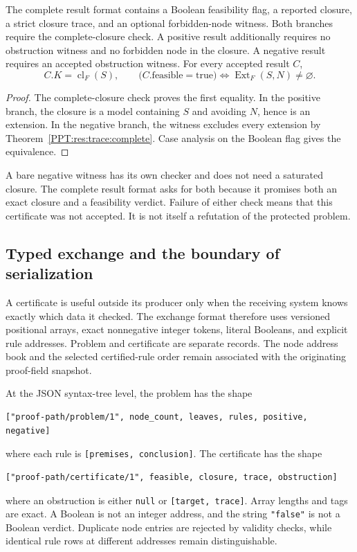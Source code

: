 \begin{PPTcorollary}
\label{PPT:res:trace:verdict}
The complete result format contains a Boolean feasibility flag, a reported closure, a strict closure trace, and an optional forbidden-node witness. Both branches require the complete-closure check. A positive result additionally requires no obstruction witness and no forbidden node in the closure. A negative result requires an accepted obstruction witness. For every accepted result $C$,
\[
 C.K=\operatorname{cl}_F(S),\qquad
 \bigl(C.\mathrm{feasible}=\mathrm{true}\bigr)
 \Longleftrightarrow
 \operatorname{Ext}_F(S,N)\ne\varnothing.
\]
\end{PPTcorollary}
\begin{proof}
The complete-closure check proves the first equality. In the positive branch, the closure is a model containing $S$ and avoiding $N$, hence is an extension. In the negative branch, the witness excludes every extension by Theorem~\ref{PPT:res:trace:complete}. Case analysis on the Boolean flag gives the equivalence.
\end{proof}

A bare negative witness has its own checker and does not need a saturated closure. The complete result format asks for both because it promises both an exact closure and a feasibility verdict. Failure of either check means that this certificate was not accepted. It is not itself a refutation of the protected problem.

\subsection{Typed exchange and the boundary of serialization}
\label{PPT:sec:trace-wire}

A certificate is useful outside its producer only when the receiving system knows exactly which data it checked. The exchange format therefore uses versioned positional arrays, exact nonnegative integer tokens, literal Booleans, and explicit rule addresses. Problem and certificate are separate records. The node address book and the selected certified-rule order remain associated with the originating proof-field snapshot.

At the JSON syntax-tree level, the problem has the shape
\begin{lstlisting}[language={}]
["proof-path/problem/1", node_count, leaves, rules, positive, negative]
\end{lstlisting}
where each rule is \texttt{[premises, conclusion]}. The certificate has the shape
\begin{lstlisting}[language={}]
["proof-path/certificate/1", feasible, closure, trace, obstruction]
\end{lstlisting}
where an obstruction is either \texttt{null} or \texttt{[target, trace]}. Array lengths and tags are exact. A Boolean is not an integer address, and the string \texttt{"false"} is not a Boolean verdict. Duplicate node entries are rejected by validity checks, while identical rule rows at different addresses remain distinguishable.

